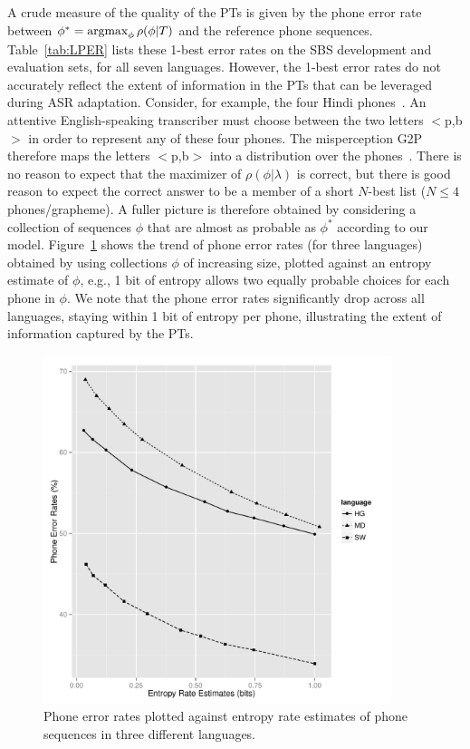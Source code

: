 A crude measure of the quality of the PTs is given by the phone error
rate between $\phi^* = \operatorname*{argmax}_{\phi} \rho(\phi|T)$ and the reference
phone sequences. Table~\ref{tab:LPER} lists these 1-best error rates
on the SBS development and evaluation sets, for all seven
languages. However, the 1-best error rates do not accurately reflect
the extent of information in the PTs that can be leveraged during ASR
adaptation.  Consider, for example, the four Hindi
phones~\ipa{[p,p\textsuperscript{h},b,\"*b]}.  An attentive
English-speaking transcriber must choose between the two letters
$<$p,b$>$ in order to represent any of these four phones.  The
misperception G2P therefore maps the letters $<$p,b$>$ into a
distribution over the phones~\ipa{[p,p\textsuperscript{h},b,\"*b]}.
There is no reason to expect that the maximizer of
$\rho(\phi|\lambda)$ is correct, but there is good reason to expect
the correct answer to be a member of a short $N$-best list ($N\le 4$
phones/grapheme).  A fuller picture is therefore obtained by
considering a collection of sequences $\phi$ that are almost as
probable as $\phi^*$ according to our model. Figure~\ref{fig:listPER}
shows the trend of phone error rates (for three languages) obtained by
using collections $\phi$ of increasing size, plotted against an
entropy estimate of $\phi$, e.g., 1 bit of entropy allows two equally
probable choices for each phone in $\phi$. We note that the phone
error rates significantly drop across all languages, staying within 1
bit of entropy per phone, illustrating the extent of information
captured by the PTs.

\begin{figure}[t!]
\begin{center}
\includegraphics[width=4in]{../figs/listper.pdf}
\end{center}
\caption{Phone error rates plotted against entropy rate estimates of phone sequences in three different languages.}
\label{fig:listPER}
\end{figure}
